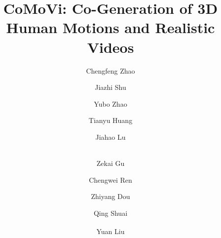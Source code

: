 \documentclass[runningheads]{llncs}
\begin{document}
\title{CoMoVi: Co-Generation of 3D Human Motions and Realistic Videos} 


\author{
Chengfeng Zhao \and
Jiazhi Shu \and
Yubo Zhao \and
Tianyu Huang \and
Jiahao Lu \and \\
Zekai Gu \and
Chengwei Ren \and
Zhiyang Dou \and
Qing Shuai \and
Yuan Liu\textsuperscript{\Letter}
}



\maketitle

\vspace{-20pt}
    







\newpage

%
%


\end{document}
